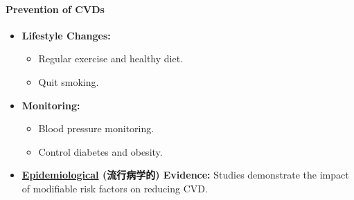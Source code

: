 \paragraph{Prevention of CVDs}
\begin{itemize}
    \item \textbf{Lifestyle Changes:}
    \begin{itemize}
        \item Regular exercise and healthy diet.
        \item Quit smoking.
    \end{itemize}
    \item \textbf{Monitoring:}
    \begin{itemize}
        \item Blood pressure monitoring.
        \item Control diabetes and obesity.
    \end{itemize}
    \item \textbf{\underline{Epidemiological} (流行病学的) Evidence:} Studies demonstrate the impact of modifiable risk factors on
    reducing CVD.
\end{itemize}